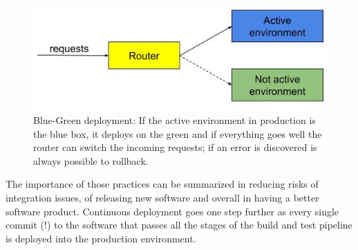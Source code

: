 \documentclass[a4paper,
               keeplastbox,   %
               ]{jacow}
\begin{document}
\begin{figure}[!htb]
   \centering
   \includegraphics*[width=1\columnwidth]{BlueGreenDeploy}
   \caption{Blue-Green deployment: If the active environment in production is the blue box, it deploys on the green and if everything goes well the router can switch the incoming requests; if an error is discovered is always possible to rollback.}
   \label{fig:bluegreendeploy}
\end{figure}
The importance of those practices can be summarized in reducing risks of integration issues, of releasing new software and overall in having a better software product. 
Continuous deployment goes one step further as every single commit (!) to the software that passes all the stages of the build and test pipeline is deployed into the production environment. 
\end{document}
